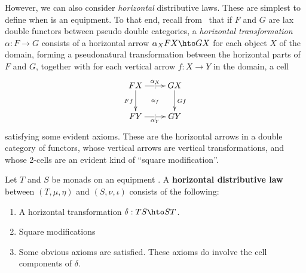 \documentclass{amsart}
\newcommand{\K}{\bbK}
\begin{document}
However, we can also consider \emph{horizontal} distributive laws.
These are simplest to define when \K is an equipment.
To that end, recall from~\cite{gp:something} that if $F$ and $G$ are lax double functors between pseudo double categories, a \emph{horizontal transformation} $\alpha:F\to G$ consists of a horizontal arrow $\alpha_X  F X \hto G X$ for each object $X$ of the domain, forming a pseudonatural transformation between the horizontal parts of $F$ and $G$, together with for each vertical arrow $f:X\to Y$ in the domain, a cell
\[ \xymatrix{ F X \ar[r]|-{|}^-{\alpha_X} \ar[d]_{F f} \ar@{}[dr]|{\alpha_f} & G X \ar[d]^{G f} \\
F Y \ar[r]|-{|}_-{\alpha_Y} & G Y} \]
satisfying some evident axioms.
These are the horizontal arrows in a double category of functors, whose vertical arrows are vertical transformations, and whose 2-cells are an evident kind of ``square modification''.

\begin{defn}\label{def:hdl}
  Let $T$ and $S$ be monads on an equipment \K.
  A \textbf{horizontal distributive law} between $(T,\mu,\eta)$ and $(S,\nu,\iota)$ consists of the following:
  \begin{enumerate}
    \item A horizontal transformation $\delta : T S \hto S T$.
    \item Square modifications

    \item Some obvious axioms are satisfied.
      These axioms do involve the cell components of $\delta$.
  \end{enumerate}
\end{defn}
\end{document}

